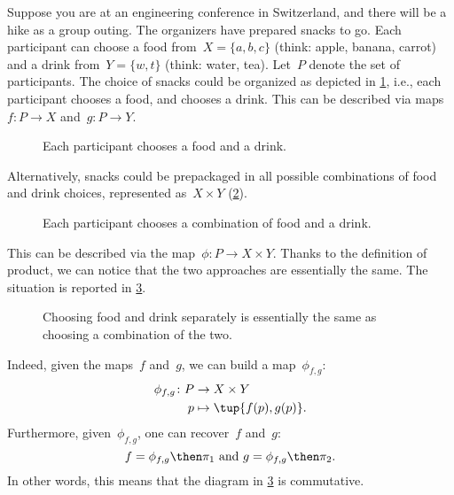 \begin{example}
Suppose you are at an engineering conference in Switzerland, and there will be a hike as a group outing. The organizers have prepared snacks to go. Each participant can choose a food from~$X=\{a,b,c\}$ (think: apple, banana, carrot) and a drink from~$Y=\{w,t\}$ (think: water, tea). Let~$P$ denote the set of participants. The choice of snacks could be organized as depicted in \cref{fig:snacks_1}, i.e., each participant chooses a food, and chooses a drink. This can be described via maps~$f\colon P\to X$ and~$g\colon P\to Y$.

\begin{figure}[h!]
\begin{center}
\end{center}
\caption{Each participant chooses a food and a drink. \label{fig:snacks_1}}
\end{figure}


Alternatively, snacks could be prepackaged in all possible combinations of food and drink choices, represented as~$X\times Y$ (\cref{fig:snacks_2}).

\begin{figure}[h!]
\begin{center}
\end{center}
\caption{Each participant chooses a combination of food and a drink. \label{fig:snacks_2}}
\end{figure}

This can be described via the map~$\phi\colon P\to X\times Y$. Thanks to the definition of product, we can notice that the two approaches are essentially the same. The situation is reported in \cref{fig:snacks_3}.

\begin{figure}[h!]
\begin{center}
\end{center}
\caption{Choosing food and drink separately is essentially the same as choosing a combination of the two. \label{fig:snacks_3}}
\end{figure}

Indeed, given the maps~$f$ and~$g$, we can build a map~$\phi_{f,g}$:
\begin{equation*}
    \begin{aligned}
    \phi_{f,g}\colon P&\to X\times Y\\
    p&\mapsto \tup{f(p),g(p)}.
    \end{aligned}
\end{equation*}
Furthermore, given~$\phi_{f,g}$, one can recover~$f$ and~$g$:
\begin{equation*}
    f=\phi_{f,g}\then \pi_1 \text{ and }g=\phi_{f,g}\then \pi_2.
\end{equation*}
In other words, this means that the diagram in \cref{fig:snacks_3} is commutative.
\end{example}

